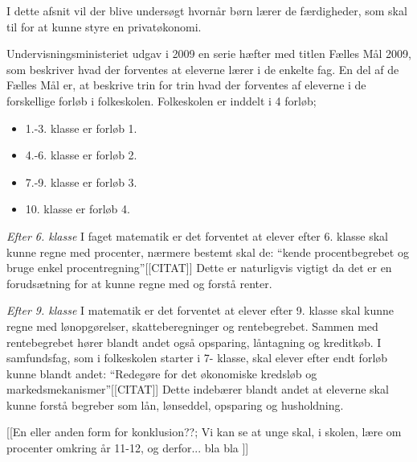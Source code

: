 I dette afsnit vil der blive undersøgt hvornår børn lærer de færdigheder, som skal til for at kunne styre en privatøkonomi.

Undervisningsministeriet udgav i 2009 en serie hæfter med titlen Fælles Mål 2009, som beskriver hvad der forventes at eleverne lærer i de enkelte fag. En del af de Fælles Mål er, at beskrive trin for trin hvad der forventes af eleverne i de forskellige forløb i folkeskolen. Folkeskolen er inddelt i 4 forløb;
\begin{itemize}
\item 1.-3. klasse er forløb 1.
\item 4.-6. klasse er forløb 2.
\item 7.-9. klasse er forløb 3.
\item 10. klasse er forløb 4.
\end{itemize}

\emph{Efter 6. klasse}
I faget matematik er det forventet at elever efter 6. klasse skal kunne regne med procenter, 
nærmere bestemt skal de: “kende procentbegrebet og bruge enkel procentregning”[[CITAT]]\cite{FallesMalMatematik}
Dette er naturligvis vigtigt da det er en forudsætning for at kunne regne med og forstå renter.


\emph{Efter 9. klasse}
I matematik er det forventet at elever efter 9. klasse skal kunne regne med lønopgørelser, skatteberegninger og rentebegrebet.\cite{FallesMalMatematik} Sammen med rentebegrebet hører blandt andet også opsparing, låntagning og kreditkøb.
I samfundsfag, som i folkeskolen starter i 7- klasse, skal elever efter endt forløb kunne blandt andet: “Redegøre for det økonomiske kredsløb og markedsmekanismer”[[CITAT]]\cite{FallesMalSamfundsfag}
Dette indebærer blandt andet at eleverne skal kunne forstå begreber som lån, lønseddel, opsparing og husholdning.

[[En eller anden form for konklusion??;
Vi kan se at unge skal, i skolen, lære om procenter omkring år 11-12, og derfor... bla bla ]]
